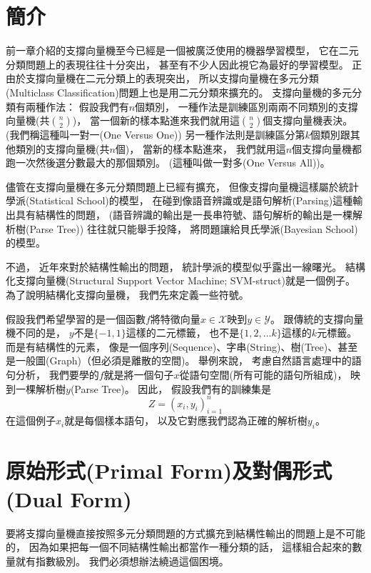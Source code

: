 \section{簡介}
  前一章介紹的支撐向量機至今已經是一個被廣泛使用的機器學習模型，
  它在二元分類問題上的表現往往十分突出，
  甚至有不少人因此視它為最好的學習模型。
  正由於支撐向量機在二元分類上的表現突出，
  所以支撐向量機在多元分類(Multiclass Classification)問題上也是用二元分類來擴充的。
  支撐向量機的多元分類有兩種作法：
  假設我們有$n$個類別，
  一種作法是訓練區別兩兩不同類別的支撐向量機(共$\binom{n}{2}$)，
  當一個新的樣本點進來我們就用這$\binom{n}{2}$個支撐向量機表決。
  (我們稱這種叫一對一(One Versus One))
  另一種作法則是訓練區分第$k$個類別跟其他類別的支撐向量機(共$n$個)，
  當新的樣本點進來，
  我們就用這$n$個支撐向量機都跑一次然後選分數最大的那個類別。
  (這種叫做一對多(One Versus All))。

  儘管在支撐向量機在多元分類問題上已經有擴充，
  但像支撐向量機這樣屬於統計學派(Statistical School)的模型，
  在碰到像語音辨識或是語句解析(Parsing)這種輸出具有結構性的問題，
  (語音辨識的輸出是一長串符號、語句解析的輸出是一棵解析樹(Parse Tree))
  往往就只能舉手投降，
  將問題讓給貝氏學派(Bayesian School)的模型。
  
  不過，
  近年來對於結構性輸出的問題，
  統計學派的模型似乎露出一線曙光。
  結構化支撐向量機(Structural Support Vector Machine; SVM-struct)\cite{SVMstruct}就是一個例子。
  為了說明結構化支撐向量機，
  我們先來定義一些符號。
  
  假設我們希望學習的是一個函數$f$將特徵向量$x \in \mathcal{X}$映到$y \in \mathcal{Y}$。
  跟傳統的支撐向量機不同的是，
  $y$不是$\lbrace -1, 1 \rbrace$這樣的二元標籤，
  也不是$\lbrace 1, 2, \ldots k \rbrace$這樣的$k$元標籤。
  而是有結構性的元素，
  像是一個序列(Sequence)、字串(String)、樹(Tree)、甚至是一般圖(Graph)（但必須是離散的空間)。
  舉例來說，
  考慮自然語言處理中的語句分析，
  我們要學的$f$就是將一個句子$x$從語句空間(所有可能的語句所組成)，
  映到一棵解析樹$y$(Parse Tree)。
  因此，
  假設我們有的訓練集是
  \begin{equation}
    Z = (x_i, y_i)_{i=1}^n 
  \end{equation}
  在這個例子$x_i$就是每個樣本語句，
  以及它對應我們認為正確的解析樹$y_i$。

\section{原始形式(Primal Form)及對偶形式(Dual Form)}
  要將支撐向量機直接按照多元分類問題的方式擴充到結構性輸出的問題上是不可能的，
  因為如果把每一個不同結構性輸出都當作一種分類的話，
  這樣組合起來的數量就有指數級別。
  我們必須想辦法繞過這個困境。


